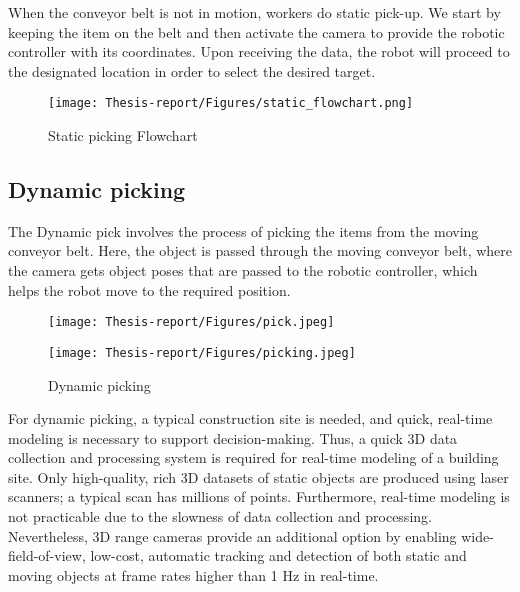 \documentclass[12pt]{article}
\begin{document}
When the conveyor belt is not in motion, workers do static pick-up.  We start by keeping the item on the belt and then activate the camera to provide the robotic controller with its coordinates.  Upon receiving the data, the robot will proceed to the designated location in order to select the desired target.

\begin{figure}[h]
    \centering
    \texttt{[image: Thesis-report/Figures/static\_flowchart.png]}
    \caption{Static picking Flowchart}
    \label{fig:Photoneo Cmaera}
\end{figure}


\subsection{Dynamic picking}
The Dynamic pick involves the process of picking the items from the moving conveyor belt. Here, the object is passed through the moving conveyor belt, where the camera gets object poses that are passed to the robotic controller, which helps the robot move to the required position.\\
\begin{figure}[h]
  \centering
  \begin{minipage}{0.45\textwidth}
    \centering
    \texttt{[image: Thesis-report/Figures/pick.jpeg]}

  \end{minipage}%
  \hspace{5mm}%
  \begin{minipage}{0.45\textwidth}
    \centering
    \texttt{[image: Thesis-report/Figures/picking.jpeg]}

  \end{minipage}
  \caption{Dynamic picking}
  \label{fig:gripper-combined}
\end{figure}

For dynamic picking, a typical construction site is needed, and quick, real-time modeling is necessary to support decision-making.  Thus, a quick 3D data collection and processing system is required for real-time modeling of a building site.  Only high-quality, rich 3D datasets of static objects are produced using laser scanners; a typical scan has millions of points.  Furthermore, real-time modeling is not practicable due to the slowness of data collection and processing.  Nevertheless, 3D range cameras provide an additional option by enabling wide-field-of-view, low-cost, automatic tracking and detection of both static and moving objects at frame rates higher than 1 Hz in real-time.\\
\end{document}
